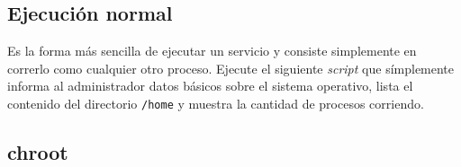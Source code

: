 \subsection{Ejecución normal}
\begin{questions}
  \question Es la forma más sencilla de ejecutar un servicio y consiste
  simplemente en correrlo como cualquier otro proceso. Ejecute el siguiente
  \textit{script} que símplemente informa al administrador datos básicos
  sobre el sistema operativo, lista el contenido del directorio
  \texttt{/home} y muestra la cantidad de procesos corriendo.
  
  
\end{questions}
\subsection{chroot}

